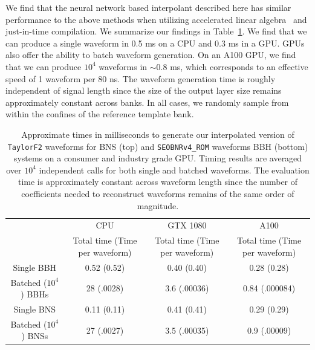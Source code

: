 \documentclass[twocolumn,prd,superscriptaddress,nofootinbib]{revtex4-1}
\begin{document}
We find that the neural network based interpolant described here has similar
performance to the above methods when utilizing accelerated linear
algebra~\cite{xla} and just-in-time compilation. We summarize our findings in
Table~\ref{table:profiling}.  We find that we can produce a single waveform in
0.5 ms on a CPU and 0.3 ms in a GPU. GPUs also offer the ability to batch
waveform generation. On an A100 GPU, we find that we can produce $10^4$
waveforms in $\sim 0.8$ ms, which corresponds to an effective speed of 1
waveform per 80 ns. The waveform generation time is roughly independent of
signal length since the size of the output layer size remains approximately
constant across banks. In all cases, we randomly sample from within the confines of the reference template bank.


\begin{table}[]
\begin{tabular}{|c|c|c|c|}
\hline
& CPU & GTX 1080 & A100 \\
& Total time (Time per waveform) & Total time (Time per waveform) & Total time (Time per waveform) \\
\hline
Single BBH & 0.52 (0.52) & 0.40 (0.40) & 0.28 (0.28)  \\
\hline
Batched ($10^4$) BBHs & 28 (.0028)  & 3.6 (.00036) & 0.84 (.000084)  \\
\hline
Single BNS & 0.11 (0.11) & 0.41 (0.41) & 0.29 (0.29)  \\
\hline
Batched ($10^4$) BNSs & 27 (.0027)  & 3.5 (.00035) & 0.9 (.00009)  \\
\hline
\end{tabular}
\caption{Approximate times in milliseconds to generate our interpolated version of \texttt{TaylorF2}
waveforms for BNS (top) and \texttt{SEOBNRv4\_ROM} waveforms BBH (bottom)
systems on a consumer and industry grade GPU. Timing results are averaged over
$10^4$ independent calls for both single and batched waveforms. The evaluation
time is approximately constant across waveform length since the number of coefficients needed to reconstruct waveforms remains of the same order of magnitude.} \label{table:profiling}
\end{table}
\end{document}
